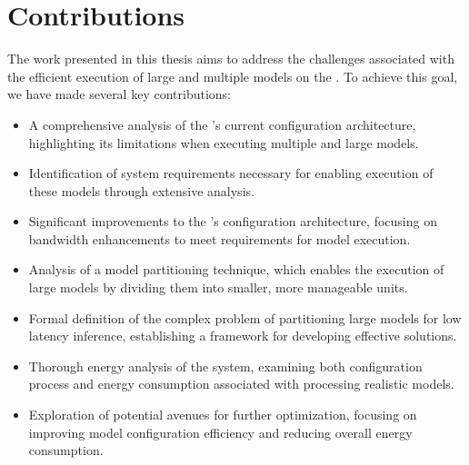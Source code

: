 \section{Contributions}
The work presented in this thesis aims to address the challenges associated with the efficient execution of large and multiple models on the \graicore{}.
To achieve this goal, we have made several key contributions:
\begin{itemize}
    \item 
    A comprehensive analysis of the \graicore{}'s current configuration architecture, highlighting its limitations when executing multiple and large models.
    \item
    Identification of system requirements necessary for enabling execution of these models through extensive analysis.
    \item
    Significant improvements to the \graicore{}'s configuration architecture, focusing on bandwidth enhancements to meet requirements for model execution.
    \item
    Analysis of a model partitioning technique, which enables the execution of large models by dividing them into smaller, more manageable units.
    \item
    Formal definition of the complex problem of partitioning large models for low latency inference, establishing a framework for developing effective solutions.
    \item
    Thorough energy analysis of the system, examining both configuration process and energy consumption associated with processing realistic models.
    \item
    Exploration of potential avenues for further optimization, focusing on improving model configuration efficiency and reducing overall energy consumption.
\end{itemize}